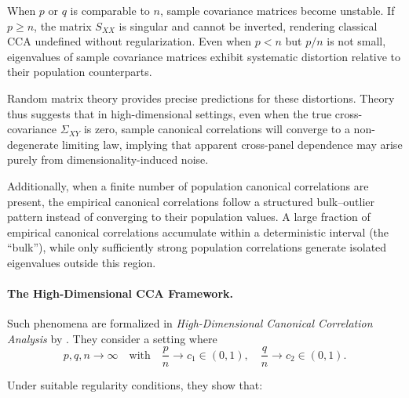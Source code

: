 \documentclass[12pt]{report} %
\begin{document}
When $p$ or $q$ is comparable to $n$, sample covariance matrices become unstable.
If $p \geq n$, the matrix $S_{XX}$ is singular and cannot be inverted, rendering classical CCA 
undefined without regularization. Even when $p < n$ but $p/n$ is not small, eigenvalues 
of sample covariance matrices exhibit systematic distortion relative to their population 
counterparts. 




Random matrix theory provides precise predictions for these distortions. Theory thus suggests that 
in high-dimensional settings, even when the true cross-covariance $\Sigma_{XY}$ is zero, 
sample canonical correlations will converge to a non-degenerate limiting law, implying that 
apparent cross-panel dependence may arise purely from dimensionality-induced noise.

Additionally, when a finite number of population canonical correlations are present, 
the empirical canonical correlations follow a structured bulk–outlier pattern instead of 
converging to their population values. A large fraction of empirical 
canonical correlations accumulate within a deterministic interval (the ``bulk''), while 
only sufficiently strong population correlations generate isolated eigenvalues outside this 
region.

\paragraph{The High-Dimensional CCA Framework.}
\label{Sec:HDCCA}

Such phenomena are formalized in \emph{High-Dimensional Canonical Correlation Analysis} 
by \citet{BykhovskayaGorin2023}. They consider a setting where
\[
p, q, n \to \infty
\quad \text{with} \quad
\frac{p}{n} \to c_1 \in (0,1), 
\quad
\frac{q}{n} \to c_2 \in (0,1).
\]

Under suitable regularity conditions, they show that:
\end{document}
